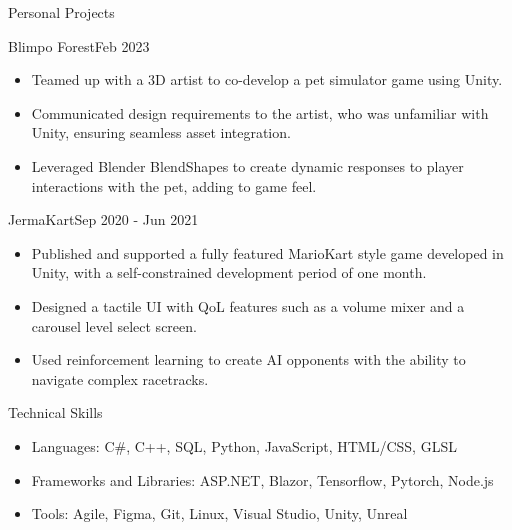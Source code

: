 \documentclass[]{mcdowellcv}
\begin{document}
\begin{cvsection}{Personal Projects}
	\begin{cvsubsection}{Blimpo Forest}{}{Feb 2023}
        \vspace{-5pt}
		\begin{itemize}
              \item Teamed up with a 3D artist to co-develop a pet simulator game using Unity.
              \item Communicated design requirements to the artist, who was unfamiliar with Unity, ensuring seamless asset integration.
              \item Leveraged Blender BlendShapes to create dynamic responses to player interactions with the pet, adding to game feel.
        \end{itemize}
	\end{cvsubsection}
         \vspace{-4pt}
  	\begin{cvsubsection}{JermaKart}{}{Sep 2020 - Jun 2021}
        \vspace{-5pt}
        
        \begin{itemize}
          \item Published and supported a fully featured MarioKart style game developed in Unity, with a self-constrained development period of one month.
          \item Designed a tactile UI with QoL features such as a volume mixer and a carousel level select screen.
          \item Used reinforcement learning to create AI opponents with the ability to navigate complex racetracks.
        \end{itemize}
	\end{cvsubsection}
 \vspace{-6pt}
\end{cvsection}
\begin{cvsection}{Technical Skills}
	\begin{cvsubsection}{}{}{}
		\begin{itemize}
			\item Languages: C\#, C++, SQL, Python, JavaScript, HTML/CSS, GLSL
			\item Frameworks and Libraries: ASP.NET, Blazor, Tensorflow, Pytorch, Node.js
			\item Tools: Agile, Figma, Git, Linux, Visual Studio, Unity, Unreal
		\end{itemize}
	\end{cvsubsection}
\end{cvsection}
\end{document}
